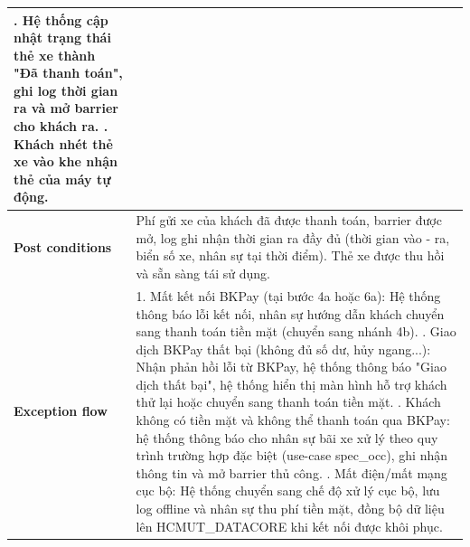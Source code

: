 \begin{longtable}{|>{\centering\arraybackslash}m{3cm}|m{13.7cm}|}
7. Hệ thống cập nhật trạng thái thẻ xe thành "Đã thanh toán", ghi log thời gian ra và mở barrier cho khách ra. \newline
8. Khách nhét thẻ xe vào khe nhận thẻ của máy tự động. \\ \hline
\textbf{Post conditions} & Phí gửi xe của khách đã được thanh toán, barrier được mở, log ghi nhận thời gian ra đầy đủ (thời gian vào - ra, biển số xe, nhân sự tại thời điểm). Thẻ xe được thu hồi và sẵn sàng tái sử dụng. \\ \hline
\textbf{Exception flow} &
1. Mất kết nối BKPay (tại bước 4a hoặc 6a): Hệ thống thông báo lỗi kết nối, nhân sự hướng dẫn khách chuyển sang thanh toán tiền mặt (chuyển sang nhánh 4b). \newline
2. Giao dịch BKPay thất bại (không đủ số dư, hủy ngang...): Nhận phản hồi lỗi từ BKPay, hệ thống thông báo "Giao dịch thất bại", hệ thống hiển thị màn hình hỗ trợ khách thử lại hoặc chuyển sang thanh toán tiền mặt. \newline
3. Khách không có tiền mặt và không thể thanh toán qua BKPay: hệ thống thông báo cho nhân sự bãi xe xử lý theo quy trình trường hợp đặc biệt (use-case spec\_occ), ghi nhận thông tin và mở barrier thủ công. \newline
4. Mất điện/mất mạng cục bộ: Hệ thống chuyển sang chế độ xử lý cục bộ, lưu log offline và nhân sự thu phí tiền mặt, đồng bộ dữ liệu lên HCMUT\_DATACORE khi kết nối được khôi phục. \\ \hline
\end{longtable}
\endgroup

